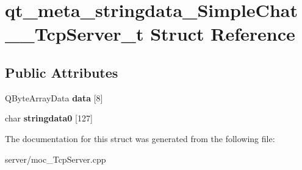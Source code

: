 \hypertarget{structqt__meta__stringdata__SimpleChat____TcpServer__t}{\section{qt\-\_\-meta\-\_\-stringdata\-\_\-\-Simple\-Chat\-\_\-\-\_\-\-Tcp\-Server\-\_\-t Struct Reference}
\label{structqt__meta__stringdata__SimpleChat____TcpServer__t}
}
\subsection*{Public Attributes}
\begin{DoxyCompactItemize}
\item 
\hypertarget{structqt__meta__stringdata__SimpleChat____TcpServer__t_a70a661bd74ea4342de4d94ba228c3ad7}{Q\-Byte\-Array\-Data {\bfseries data} \mbox{[}8\mbox{]}}\label{structqt__meta__stringdata__SimpleChat____TcpServer__t_a70a661bd74ea4342de4d94ba228c3ad7}

\item 
\hypertarget{structqt__meta__stringdata__SimpleChat____TcpServer__t_a1eb1e815c35c9633c0e90c2e96c949bc}{char {\bfseries stringdata0} \mbox{[}127\mbox{]}}\label{structqt__meta__stringdata__SimpleChat____TcpServer__t_a1eb1e815c35c9633c0e90c2e96c949bc}

\end{DoxyCompactItemize}


The documentation for this struct was generated from the following file\-:\begin{DoxyCompactItemize}
\item 
server/moc\-\_\-\-Tcp\-Server.\-cpp\end{DoxyCompactItemize}
